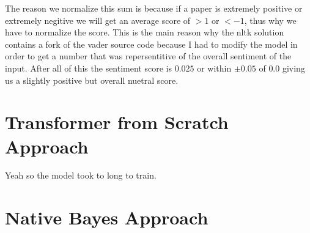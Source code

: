 \documentclass[12pt]{article}
\begin{document}
The reason we normalize this sum is because if a paper is extremely positive 
or extremely negitive we will get an average score of $>1$ or $<-1$, thus why we
have to normalize the score. This is the main reason why the nltk solution
contains a fork of the vader source code because I had to modify the model in order
to get a number that was repersentitive of the overall sentiment of the input.
After all of this the sentiment score is $0.025$ or within $\pm0.05$ of $0.0$ giving
us a slightly positive but overall nuetral score.

\newpage
\section{Transformer from Scratch Approach}
Yeah so the model took to long to train.

\newpage
\section{Native Bayes Approach}

\newpage
{}

\end{document}
